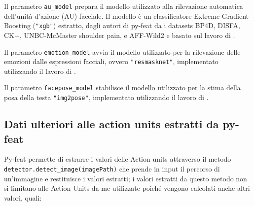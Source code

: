 Il parametro \texttt{au_model} prepara il modello utilizzato alla rilevazione automatica dell'unità d'azione (AU) facciale. Il modello è un classificatore Extreme Gradient Boosting (\texttt{"xgb"}) estratto, dagli autori di py-feat da i datasets BP4D, DISFA, CK+, UNBC-McMaster shoulder pain, e AFF-Wild2 e basato sul lavoro di \cite{ChenG16}.

Il parametro \texttt{emotion_model} avvia il modello utilizzato per la rilevazione delle emozioni dalle espressioni facciali, ovvero \texttt{"resmasknet"}, implementato utilizzando il lavoro di \cite{FacialExprRecoUseResMaskNet}.

Il parametro \texttt{facepose_model} stabilisce il modello utilizzato per la stima della posa della testa \texttt{"img2pose"}, implementato utilizzando il lavoro di \cite{img2pose}.

\subsection{Dati ulteriori alle action units estratti da py-feat}
Py-feat permette di estrarre i valori delle Action units attraverso il metodo \texttt{detector.detect_image(imagePath)} che prende in input il percorso di un’immagine e restituisce i valori estratti; i valori estratti da questo metodo non si limitano alle Action Units da me utilizzate poiché vengono calcolati anche altri valori, quali:

